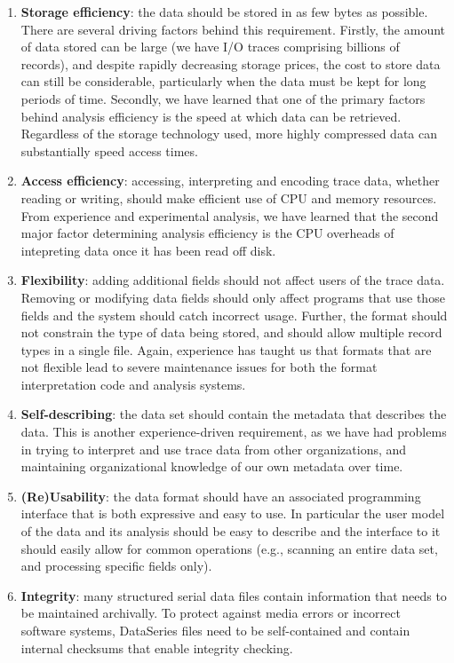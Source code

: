 \documentclass{acm_proc_article-sp}
\begin{document}
\begin{enumerate}

\item \textbf{Storage efficiency}: the data should be stored in as few
bytes as possible. There are several driving factors behind this
requirement. Firstly, the amount of data stored can be large (we have
I/O traces comprising billions of records), and despite rapidly
decreasing storage prices, the cost to store data can still be
considerable, particularly when the data must be kept for long periods
of time. Secondly, we have learned that one of the primary factors
behind analysis efficiency is the speed at which data can be
retrieved. Regardless of the storage technology used, more highly
compressed data can substantially speed access times.

\item \textbf{Access efficiency}: accessing, interpreting and encoding
trace data, whether reading or writing, should make efficient use of
CPU and memory resources. From experience and experimental analysis,
we have learned that the second major factor determining analysis
efficiency is the CPU overheads of intepreting data once it has been
read off disk.

\item \textbf{Flexibility}: adding additional fields should not affect
users of the trace data.  Removing or modifying data fields should
only affect programs that use those fields and the system should
catch incorrect usage.  Further, the format should not constrain
the type of data being stored, and should allow multiple record types
in a single file. Again, experience has taught us that formats that
are not flexible lead to severe maintenance issues for both the format
interpretation code and analysis systems.

\item \textbf{Self-describing}: the data set should contain the
metadata that describes the data. This is another experience-driven
requirement, as we have had problems in trying to interpret and use
trace data from other organizations, and maintaining organizational
knowledge of our own metadata over time.

\item \textbf{(Re)Usability}: the data format should have an
associated programming interface that is both expressive and easy to
use. In particular the user model of the data and its analysis should
be easy to describe and the interface to it should easily allow for
common operations (e.g., scanning an entire data set, and processing
specific fields only).

\item \textbf{Integrity}: many structured serial data files contain
information that needs to be maintained archivally. To protect against media
errors or incorrect software systems, DataSeries files need to be
self-contained and contain internal checksums that enable
integrity checking.

\end{enumerate}
\end{document}
